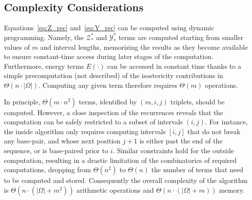 \subsection{Complexity Considerations}
Equations~\eqref{eq:Z_rec} and~\eqref{eq:Y_rec} can be computed using dynamic programming. Namely, the $\mathcal{Z}^{*}_{*}$ and $\mathcal{Y}^{*}_{*}$ terms are computed starting from smaller values of $m$ and interval lengths, memorizing the results as they become available to ensure constant-time access during later stages of the computation. Furthermore, energy terms $E(\cdot)$ can be accessed in constant time thanks to a simple precomputation (not described)  of the isostericity contributions in $\Theta(n\cdot|\Omega|)$. Computing any given term therefore requires $\Theta(m)$ operations.

In principle, $\Theta(m\cdot n^2)$ terms, identified by $(m,i,j)$ triplets, should be computed.
However, a close inspection of the recurrences reveals that the computation can be safely restricted to a subset of intervals $(i,j)$.
For instance, the inside algorithm only requires computing intervals $[i,j]$ that do not break any base-pair, and whose next position $j+1$ is either past the end of the sequence, or is base-paired prior to $i$. Similar constraints hold for the outside computation, resulting in a drastic limitation of the combinatorics of required computations, dropping from $\Theta(n^2)$ to $\Theta(n)$ the number of terms that need to be computed and stored. Consequently the overall complexity of the algorithm is $\Theta(n\cdot(|\Omega|+m^2))$ arithmetic operations and $\Theta(n\cdot(|\Omega|+m))$ memory.
